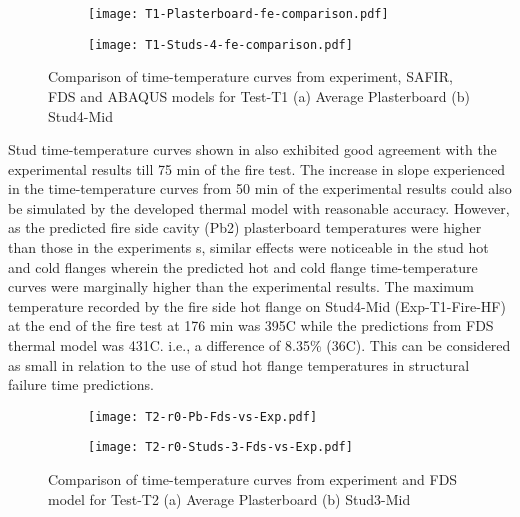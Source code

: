 \begin{figure}[!htbp]
	\centering
	\begin{subfigure}[b]{0.7\textwidth}
		\centering
		\texttt{[image: T1-Plasterboard-fe-comparison.pdf]}
		\caption{}
		\label{subfig:T1-Plasterboard-fe-comparison}
	\end{subfigure}
	\begin{subfigure}[b]{0.6\textwidth}
		\centering
		\texttt{[image: T1-Studs-4-fe-comparison.pdf]}
		\caption{}
		\label{subfig:T1-Studs-4-fe-comparison}
	\end{subfigure}
	   \caption{Comparison of time-temperature curves from experiment, SAFIR, FDS and ABAQUS models for Test-T1 (a) Average Plasterboard (b) Stud4-Mid}
	   \label{fig:fe-model-output-comparison}
\end{figure}

Stud time-temperature curves shown in  also exhibited good agreement with the experimental results till 75 min of the fire test. The increase in slope experienced in the time-temperature curves from 50 min of the experimental results could also be simulated by the developed thermal model with reasonable accuracy. However, as the predicted fire side cavity (Pb2) plasterboard temperatures were higher than those in the experiments s, similar effects were noticeable in the stud hot and cold flanges wherein the predicted hot and cold flange time-temperature curves were marginally higher than the experimental results. The maximum temperature recorded by the fire side hot flange on Stud4-Mid (Exp-T1-Fire-HF) at the end of the fire test at 176 min was 395\degree C while the predictions from FDS thermal model was 431\degree C. i.e., a difference of 8.35\% (36\degree C). This can be considered as small in relation to the use of stud hot flange temperatures in  structural failure time predictions. 
\begin{figure}[!htbp]
	\centering
	\begin{subfigure}[b]{0.7\textwidth}
		\centering
		\texttt{[image: T2-r0-Pb-Fds-vs-Exp.pdf]}
		\caption{}
		\label{subfig:T2-r0-Pb-Fds-vs-Exp}
	\end{subfigure}
	\begin{subfigure}[b]{0.6\textwidth}
		\centering
		\texttt{[image: T2-r0-Studs-3-Fds-vs-Exp.pdf]}
		\caption{}
		\label{subfig:T2-r0-Studs-3-Fds-vs-Exp}
	\end{subfigure}
	   \caption{Comparison of time-temperature curves from experiment and FDS model for Test-T2 (a) Average Plasterboard (b) Stud3-Mid}
	   \label{fig:fds-output-pb-studs-t2}
\end{figure}

